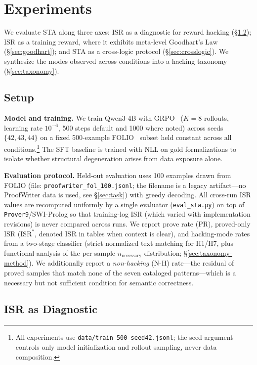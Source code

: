 \section{Experiments}
\label{sec:experiments}

We evaluate STA along three axes: ISR as a diagnostic for reward hacking (\S\ref{sec:diagnostic}); ISR as a training reward, where it exhibits meta-level Goodhart's Law (\S\ref{sec:goodhart}); and STA as a cross-logic protocol (\S\ref{sec:crosslogic}).
We synthesize the modes observed across conditions into a hacking taxonomy (\S\ref{sec:taxonomy}).

\subsection{Setup}\label{sec:setup}

\textbf{Model and training.}
We train Qwen3-4B with GRPO~\citep{deepseekmath} ($K{=}8$ rollouts, learning rate $10^{-6}$, 500 steps default and 1000 where noted) across seeds $\{42,43,44\}$ on a fixed 500-example FOLIO~\citep{folio} subset held constant across all conditions.\footnote{All experiments use \texttt{data/train\_500\_seed42.jsonl}; the seed argument controls only model initialization and rollout sampling, never data composition.}
The SFT baseline is trained with NLL on gold formalizations to isolate whether structural degeneration arises from data exposure alone.

\textbf{Evaluation protocol.}
Held-out evaluation uses 100 examples drawn from FOLIO (file: \texttt{proofwriter\_fol\_100.jsonl}; the filename is a legacy artifact---no ProofWriter data is used, see \S\ref{sec:task}) with greedy decoding.
All cross-run ISR values are recomputed uniformly by a single evaluator (\texttt{eval\_sta.py}) on top of \texttt{Prover9}/SWI-Prolog so that training-log ISR (which varied with implementation revisions) is never compared across runs.
We report prove rate (PR), proved-only ISR ($\text{ISR}^*$, denoted ISR in tables when context is clear), and hacking-mode rates from a two-stage classifier (strict normalized text matching for H1/H7, plus functional analysis of the per-sample $n_{\text{necessary}}$ distribution; \S\ref{sec:taxonomy-method}).
We additionally report a \emph{non-hacking} (N-H) rate---the residual of proved samples that match none of the seven cataloged patterns---which is a necessary but not sufficient condition for semantic correctness.

\subsection{ISR as Diagnostic}
\label{sec:diagnostic}


